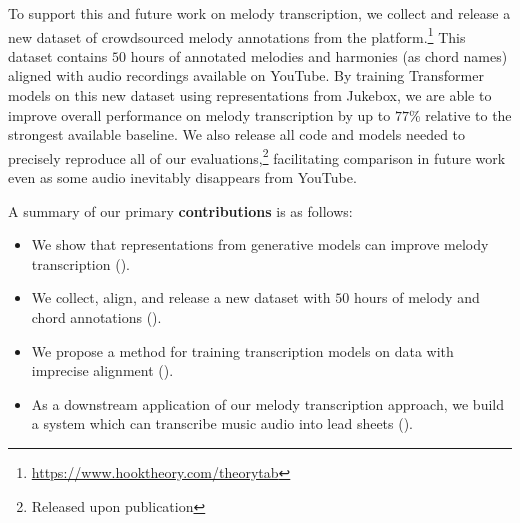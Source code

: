 To support this and future work on melody transcription, we collect and release a new dataset of crowdsourced melody annotations from the \hooktheory{} platform.\footnote{\url{https://www.hooktheory.com/theorytab}} 
This dataset contains $50$ hours of annotated melodies and harmonies (as chord names) aligned with audio recordings available on YouTube. 
By training Transformer models on this new dataset using representations from Jukebox, we are able to improve overall performance on melody transcription by 
up to $77$\% 
relative to the strongest available baseline. 
We also release all code and models needed to precisely reproduce all of our evaluations,\footnote{Released upon publication} facilitating comparison in future work even as some audio inevitably disappears from YouTube.


A summary of our primary \textbf{contributions} is as follows:
\begin{itemize}
    \item We show that representations from generative models can improve melody transcription ().
    \item We collect, align, and release a new dataset with $50$ hours of melody and chord annotations ().
    \item We propose a method for training transcription models on data with imprecise alignment ().
    \item As a downstream application of our melody transcription approach, we build a system which can transcribe music audio into lead sheets ().
\end{itemize}
